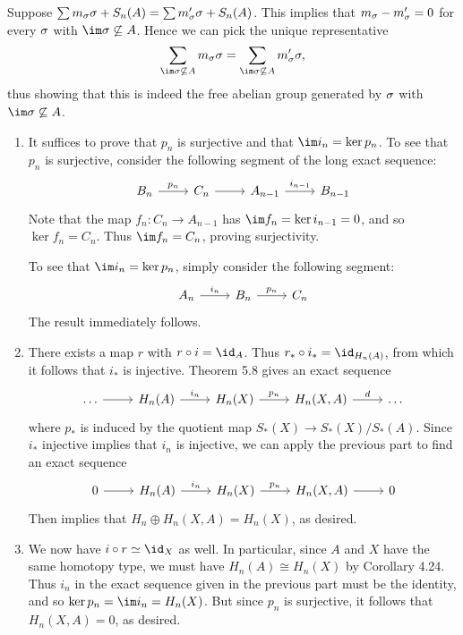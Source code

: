 \documentclass[../../solutions.tex]{subfiles}
\begin{document}
\begin{exercise} \leavevmode
Suppose $\sum m_\sigma\sigma+S_n(A)=\sum m'_\sigma\sigma+S_n(A)$. 
This implies that $m_\sigma-m'_\sigma=0$ for every $\sigma$ with $\im\sig\not\subseteq A$. 
Hence we can pick the unique representative \[\sum_{\im\sig\not\subseteq A}m_\sig\sig=\sum_{\im\sig\not\subseteq A}m'_\sig\sig,\] thus showing that this is indeed the free abelian group generated by $\sigma$ with $\im\sig\not\subseteq A$. 
\end{exercise}

\begin{exercise} \leavevmode
\begin{enumerate}
\item It suffices to prove that $p_n$ is surjective and that $\im i_n=\ker p_n$. 
To see that $p_n$ is surjective, consider the following segment of the long exact sequence: 
\[\begin{tikzcd}
B_n\ar[r,"p_n"] & C_n \ar[r] & A_{n-1} \ar[r,"i_{n-1}"] & B_{n-1}
\end{tikzcd}\]
Note that the map $f_n:C_n\to A_{n-1}$ has $\im f_n=\ker i_{n-1}=0$, and so $\ker f_n=C_n$.
Thus $\im f_n=C_n$, proving surjectivity. 

To see that $\im i_n=\ker p_n$, simply consider the following segment: 
\[\begin{tikzcd}
A_n\ar[r,"i_n"] & B_n \ar[r,"p_n"] & C_n
\end{tikzcd}\]
The result immediately follows. 

\item There exists a map $r$ with $r\circ i=\id_A$. 
Thus $r_*\circ i_*=\id_{H_n(A)}$, from which it follows that $i_*$ is injective. 
Theorem 5.8 gives an exact sequence 
\[\begin{tikzcd}
\dots\ar[r] & H_n(A)\ar[r,"i_n"] & H_n(X)\ar[r,"p_n"] & H_n(X,A)\ar[r,"d"] & \dots
\end{tikzcd}\]
where $p_*$ is induced by the quotient map $S_*(X)\to S_*(X)/S_*(A)$.
Since $i_*$ injective implies that $i_n$ is injective, we can apply the previous part to find an exact sequence 
\[\begin{tikzcd}
0\ar[r] & H_n(A)\ar[r,"i_n"] & H_n(X)\ar[r,"p_n"] & H_n(X,A)\ar[r] & 0
\end{tikzcd}\]
Then  implies that $H_n\oplus H_n(X,A)=H_n(X)$, as desired. 

\item We now have $i\circ r\simeq\id_X$ as well.
In particular, since $A$ and $X$ have the same homotopy type, we must have $H_n(A)\cong H_n(X)$ by Corollary 4.24.
Thus $i_n$ in the exact sequence given in the previous part must be the identity, and so $\ker p_n=\im i_n=H_n(X)$. 
But since $p_n$ is surjective, it follows that $H_n(X,A)=0$, as desired. 
\end{enumerate}
\end{exercise}
\end{document}
